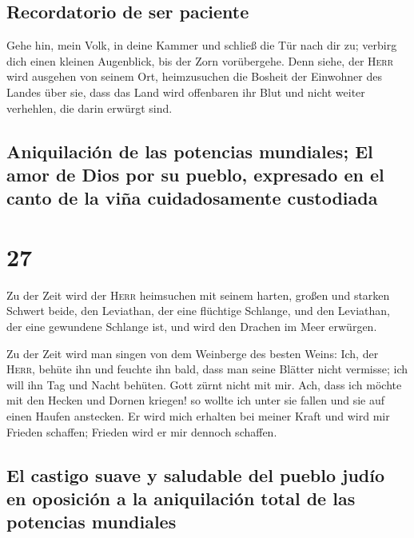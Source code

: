 \hypertarget{recordatorio-de-ser-paciente}{%
\subsection{Recordatorio de ser
paciente}\label{recordatorio-de-ser-paciente}}

 Gehe hin, mein Volk, in deine Kammer und schließ die Tür
nach dir zu; verbirg dich einen kleinen Augenblick, bis der Zorn
vorübergehe.  Denn siehe, der \textsc{Herr} wird ausgehen
von seinem Ort, heimzusuchen die Bosheit der Einwohner des Landes über
sie, dass das Land wird offenbaren ihr Blut und nicht weiter verhehlen,
die darin erwürgt sind.

\hypertarget{aniquilaciuxf3n-de-las-potencias-mundiales-el-amor-de-dios-por-su-pueblo-expresado-en-el-canto-de-la-viuxf1a-cuidadosamente-custodiada}{%
\subsection{Aniquilación de las potencias mundiales; El amor de Dios por
su pueblo, expresado en el canto de la viña cuidadosamente
custodiada}\label{aniquilaciuxf3n-de-las-potencias-mundiales-el-amor-de-dios-por-su-pueblo-expresado-en-el-canto-de-la-viuxf1a-cuidadosamente-custodiada}}

\hypertarget{section-26}{%
\section{27}\label{section-26}}

 Zu der Zeit wird der \textsc{Herr} heimsuchen mit seinem
harten, großen und starken Schwert beide, den Leviathan, der eine
flüchtige Schlange, und den Leviathan, der eine gewundene Schlange ist,
und wird den Drachen im Meer erwürgen.

 Zu der Zeit wird man singen von dem Weinberge des besten
Weins:  Ich, der \textsc{Herr}, behüte ihn und feuchte ihn
bald, dass man seine Blätter nicht vermisse; ich will ihn Tag und Nacht
behüten.  Gott zürnt nicht mit mir. Ach, dass ich möchte
mit den Hecken und Dornen kriegen! so wollte ich unter sie fallen und
sie auf einen Haufen anstecken.  Er wird mich erhalten bei
meiner Kraft und wird mir Frieden schaffen; Frieden wird er mir dennoch
schaffen.

\hypertarget{el-castigo-suave-y-saludable-del-pueblo-juduxedo-en-oposiciuxf3n-a-la-aniquilaciuxf3n-total-de-las-potencias-mundiales}{%
\subsection{El castigo suave y saludable del pueblo judío en oposición a
la aniquilación total de las potencias
mundiales}\label{el-castigo-suave-y-saludable-del-pueblo-juduxedo-en-oposiciuxf3n-a-la-aniquilaciuxf3n-total-de-las-potencias-mundiales}}

